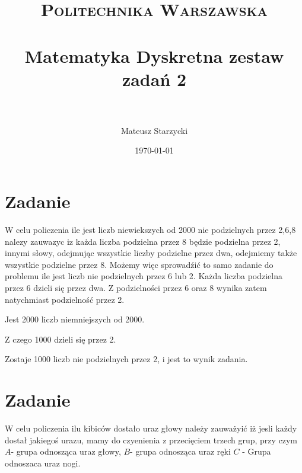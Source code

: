 \documentclass[paper=a4, fontsize=11pt]{scrartcl} %
\title{ 
    \normalfont \normalsize 
    \textsc{Politechnika Warszawska} \\ [25pt] %
    \horrule{0.5pt} \\[0.4cm] %
    \huge Matematyka Dyskretna zestaw zadań 2\\ %
    \horrule{2pt} \\[0.5cm] %
}
\author{Mateusz Starzycki} %
\date{\normalsize\today} %
\numberwithin{equation}{section} %
\numberwithin{figure}{section} %
\numberwithin{table}{section} %
\begin{document}
\maketitle %


\newpage

\section{Zadanie}

W celu policzenia ile jest liczb niewiekszych od 2000 nie podzielnych przez 2,6,8 nalezy zauwazyc iz
każda liczba podzielna przez 8 będzie podzielna przez 2, innymi słowy, odejmując wszystkie liczby podzielne
przez dwa, odejmiemy także wszystkie podzielne przez 8. Możemy więc sprowadźić to samo zadanie do problemu
ile jest liczb nie podzielnych przez 6 lub 2. Każda liczba podzielna przez 6 dzieli się przez dwa.
Z podzielności przez 6 oraz 8 wynika zatem natychmiast podzielność przez 2.

Jest 2000 liczb niemniejszych od 2000.

Z czego 1000 dzieli się przez 2.

Zostaje 1000 liczb nie podzielnych przez 2, i jest to wynik zadania.

\section{Zadanie}

W celu policzenia ilu kibiców dostało uraz głowy należy zauważyić iż jesli każdy dostał 
jakiegoś urazu, mamy do czyenienia z przecięciem trzech grup, przy czym \(A\)- grupa
odnosząca uraz głowy, \(B\)- grupa odnosząca uraz ręki \(C\) - Grupa odnoszaca uraz nogi.
\end{document}
